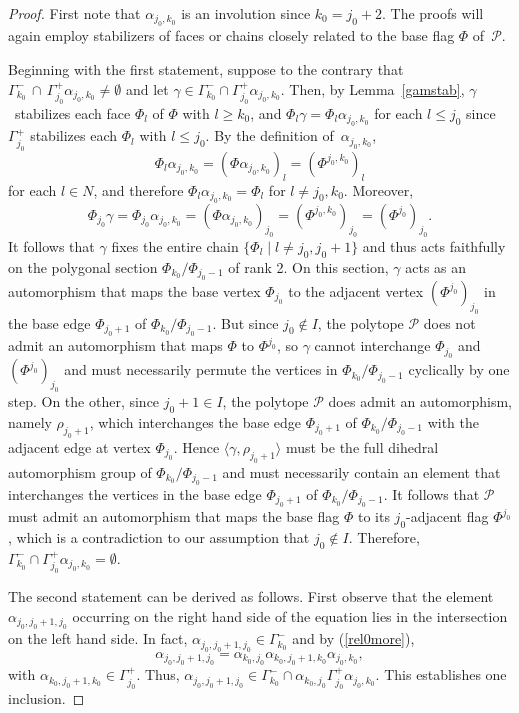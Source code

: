 \documentclass[12pt]{article}
\renewcommand{\>}{\rangle}
\renewcommand{\leq}{\leqslant}
\renewcommand{\geq}{\geqslant}
\theoremstyle{definition}\newtheorem{definition}{Definition}[section]
\begin{document}
\begin{proof}
First note that $\alpha_{j_0,k_0}$ is an involution since $k_{0}=j_{0}+2$. The proofs will again employ stabilizers of faces or chains closely related to the base flag $\Phi$ of~$\mathcal{P}$. 

Beginning with the first statement, suppose to the contrary that 
$\Gamma_{k_0}^{-}\,\cap\,\Gamma_{j_0}^{+}\alpha_{j_0,k_0}\neq\emptyset$ 
and let $\gamma\in\Gamma_{k_0}^{-}\cap\Gamma_{j_0}^{+}\alpha_{j_0,k_0}$. Then, by Lemma~\ref{gamstab}, $\gamma$~stabilizes each face $\Phi_l$ of $\Phi$ with $l\geq k_0$, and $\Phi_{l}\gamma=\Phi_{l}\alpha_{j_0,k_0}$ for each $l\leq j_0$ since $\Gamma_{j_0}^{+}$ stabilizes each $\Phi_l$ with $l\leq j_0$. By the definition of~$\alpha_{j_0,k_0}$,  
\[\Phi_{l}\alpha_{j_0,k_0} = (\Phi\alpha_{j_0,k_0})_{l} = (\Phi^{j_0,k_0})_l\]
for each $l\in N$, and therefore $\Phi_{l}\alpha_{j_0,k_0}=\Phi_l$ for $l\neq j_0,k_0$. Moreover, 
\[\Phi_{j_0}\gamma=\Phi_{j_0}\alpha_{j_0,k_0}=(\Phi\alpha_{j_0,k_0})_{j_0}
=(\Phi^{j_0,k_0})_{j_0}=(\Phi^{j_0})_{j_0}.\]
It follows that $\gamma$ fixes the entire chain $\{\Phi_l\mid l\neq j_0,j_{0}\!+\!1\}$ and thus acts faithfully on the polygonal section $\Phi_{k_0}/\Phi_{j_{0}-1}$ of rank 2. On this section, $\gamma$ acts as an automorphism that maps the base vertex $\Phi_{j_0}$ to the adjacent vertex $(\Phi^{j_0})_{j_0}$ in the base edge $\Phi_{j_{0}+1}$ of $\Phi_{k_0}/\Phi_{j_{0}-1}$. But since $j_0\notin I$, the polytope $\mathcal{P}$ does not admit an automorphism that maps $\Phi$ to $\Phi^{j_0}$, so $\gamma$ cannot interchange $\Phi_{j_0}$ and $(\Phi^{j_0})_{j_0}$ and must necessarily permute the vertices in $\Phi_{k_0}/\Phi_{j_{0}-1}$ cyclically by one step. On the other, since $j_{0}+1\in I$, the polytope $\mathcal{P}$ does admit an automorphism, namely $\rho_{j_{0}+1}$, which interchanges the base edge $\Phi_{j_{0}+1}$ of $\Phi_{k_0}/\Phi_{j_{0}-1}$ with the adjacent edge at vertex $\Phi_{j_0}$. Hence $\langle\gamma,\rho_{j_{0}+1}\rangle$ must be the full dihedral automorphism group of $\Phi_{k_0}/\Phi_{j_{0}-1}$ and must necessarily contain an element that interchanges the vertices in the base edge $\Phi_{j_{0}+1}$ of $\Phi_{k_0}/\Phi_{j_{0}-1}$. It follows that $\mathcal{P}$ must admit an automorphism that maps the base flag $\Phi$ to its $j_0$-adjacent flag $\Phi^{j_0}$, which is a contradiction to our assumption that $j_0\notin I$. Therefore, 
$\Gamma_{k_0}^{-}\cap\Gamma_{j_0}^{+}\alpha_{j_0,k_0}=\emptyset$. 

The second statement can be derived as follows. First observe that the element $\alpha_{j_0,j_{0}+1,j_{0}}$ occurring on the right hand side of the equation lies in the intersection on the left hand side. In fact, $\alpha_{j_0,j_{0}+1,j_{0}}\in\Gamma_{k_0}^{-}$  and by (\ref{rel0more}),
\[\alpha_{j_0,j_{0}+1,j_{0}} = \alpha_{k_0,j_0}\alpha_{k_0,j_{0}+1,k_{0}}\alpha_{j_0,k_0},\]
with $\alpha_{k_0,j_{0}+1,k_{0}}\in\Gamma_{j_0}^{+}$. Thus, 
$\alpha_{j_0,j_{0}+1,j_{0}}\in\Gamma_{k_0}^{-}\cap\alpha_{k_0,j_0}\Gamma_{j_0}^{+}\alpha_{j_0,k_0}$. 
This establishes one inclusion.


\end{proof}
\end{document}
